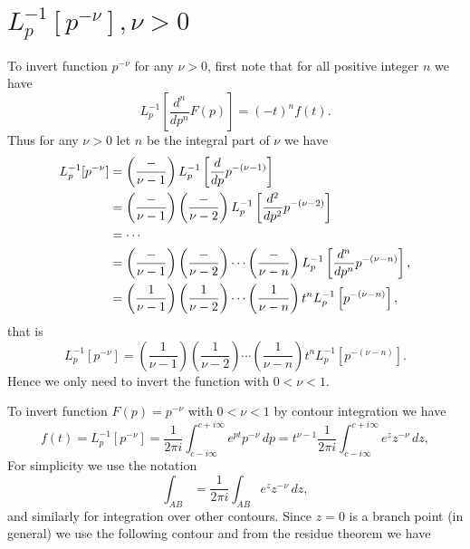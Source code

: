 \section{$L_p^{-1}[ p^{-\nu} ], \nu>0 $ }
To invert function $p^{-\nu}$ for any $\nu>0$, first note that
for all positive integer $n$ we have
\[
  L_p^{-1} \left[ \frac{d^n}{dp^n} F(p) \right] = (-t)^n f(t).
\]
Thus for any $\nu>0$ let $n$ be the integral part of $\nu$ we have
\begin{align*} 
  L_p^{-1}[p^{-\nu}] 
    &= \left( \frac{-}{\nu-1} \right) 
        L_p^{-1} \left[\frac{d}{dp} p^{-(\nu-1)} \right] \notag \\
    &= \left( \frac{-}{\nu-1} \right) \left( \frac{-}{\nu-2} \right) 
        L_p^{-1} \left[\frac{d^2}{dp^2} p^{-(\nu-2)} \right] \notag \\
    &= \cdots  \notag \\
    &= \left( \frac{-}{\nu-1} \right) \left( \frac{-}{\nu-2} \right) 
       \cdots \left( \frac{-}{\nu-n} \right) 
        L_p^{-1} \left[\frac{d^n}{dp^n} p^{-(\nu-n)} \right], \notag \\
    &= \left( \frac{1}{\nu-1} \right) \left( \frac{1}{\nu-2} \right) 
       \cdots \left( \frac{1}{\nu-n} \right) 
       t^n L_p^{-1} \left[ p^{-(\nu-n)} \right], \notag \\
\end{align*}
that is
\begin{equation} \label{E:ilt_pow}
  L_p^{-1}[p^{-\nu}] 
    = \left( \frac{1}{\nu-1} \right) \left( \frac{1}{\nu-2} \right) 
      \cdots \left( \frac{1}{\nu-n} \right) 
      t^n L_p^{-1} \left[ p^{-(\nu-n)} \right].
\end{equation}
Hence we only need to invert the function with $0<\nu<1$.

To invert function $F(p)=p^{-\nu}$ with $0<\nu<1$ by contour integration we have
\[
  f(t) = L_p^{-1} \left[ p^{-\nu} \right]
       = \frac{1}{2\pi i}   
           \int_{c-i\infty}^{c+i\infty} e^{p t} p^{-\nu}\, dp
       = t^{\nu-1} 
           \frac{1}{2\pi i} \int_{c-i\infty}^{c+i\infty} e^{z} z^{-\nu}\, dz,
\]
For simplicity we use the notation
\[
   \int_{AB} = \frac{1}{2\pi i} \int_{AB} e^{z} z^{-\nu}\, dz,
\]
and similarly for integration over other contours.
Since $z=0$ is a branch point (in general) we use the following contour and 
from the residue theorem we have


